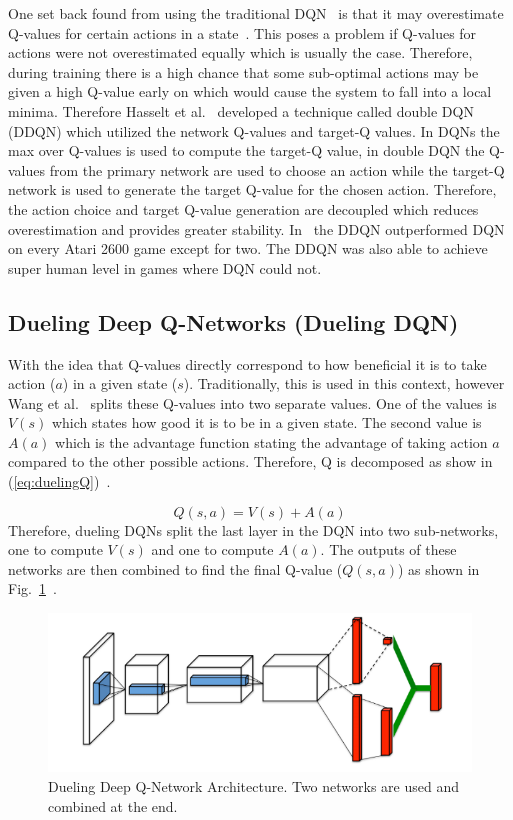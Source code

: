\documentclass[12pt,american]{report}
\begin{document}
One set back found from using the traditional DQN~\cite{atari} is that it may overestimate Q-values for certain actions in a state~\cite{van2016deep}. This poses a problem if Q-values for actions were not overestimated equally which is usually the case.  Therefore, during training there is a high chance that some sub-optimal actions may be given a high Q-value early on which would cause the system to fall into a local minima.  Therefore Hasselt et al.~\cite{van2016deep} developed a technique called double DQN (DDQN) which utilized the network Q-values and target-Q values.  In DQNs the max over Q-values is used to compute the target-Q value, in double DQN the Q-values from the primary network are used to choose an action while the target-Q network is used to generate the target Q-value for the chosen action. Therefore, the action choice and target Q-value generation are decoupled which reduces overestimation and provides greater stability.  In~\cite{van2016deep} the DDQN outperformed DQN on every Atari 2600 game except for two. The DDQN was also able to achieve super human level in games where DQN could not. 

\subsection{Dueling Deep Q-Networks (Dueling DQN)}
\label{sec:DuelingDQN}
With the idea that Q-values directly correspond to how beneficial it is to take action ($a$) in a given state ($s$). Traditionally, this is used in this context, however Wang et al.~\cite{wang2015dueling} splits these Q-values into two separate values.  One of the values is $V(s)$ which states how good it is to be in a given state. The second value is $A(a)$ which is the advantage function stating the advantage of taking action $a$ compared to the other possible actions.  Therefore, Q is decomposed as show in (\ref{eq:duelingQ})~\cite{wang2015dueling}.

\begin{equation}
          \label{eq:duelingQ}
          Q(s,a) = V(s) + A(a)%
\end{equation}
Therefore, dueling DQNs split the last layer in the DQN into two sub-networks, one to compute $V(s)$ and one to compute $A(a)$.  The outputs of these networks are then combined to find the final Q-value ($Q(s,a)$) as shown in Fig.~\ref{fig:duelingDQN}~\cite{wang2015dueling}.

\begin{figure}
\centering
\includegraphics[scale=1]{images/duelingDQN.png}
\caption{Dueling Deep Q-Network Architecture. Two networks are used and combined at the end.~\cite{wang2015dueling}}
\label{fig:duelingDQN}
\end{figure}
\end{document}

